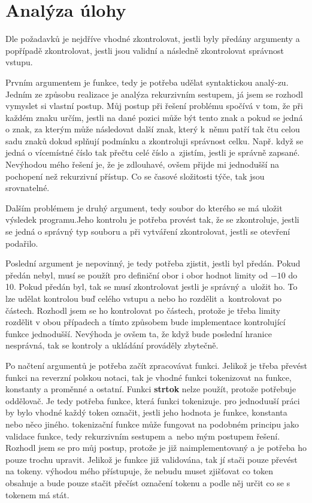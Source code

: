 \documentclass[../main.tex]{subfiles}
\begin{document}
\section{Analýza úlohy}
Dle požadavků je nejdříve vhodné zkontrolovat, jestli byly předány argumenty a popřípadě zkontrolovat, jestli jsou validní a následně zkontrolovat správnost vstupu.
\vspace{0.5em}

Prvním argumentem je funkce, tedy je potřeba udělat syntaktickou analý-zu. Jedním ze způsobu realizace je analýza rekurzivním sestupem, já jsem se rozhodl vymyslet si vlastní postup. Můj postup při řešení problému spočívá v tom, že při každém znaku určím, jestli na dané pozici může být tento znak a pokud se jedná o znak, za kterým může následovat další znak, který k~němu patří tak čtu celou sadu znaků dokud splňují podmínku a zkontroluji správnost celku. Např. když se jedná o vícemístné číslo tak přečtu celé číslo a~zjistím, jestli je správně zapsané. Nevýhodou mého řešení je, že je zdlouhavé, ovšem přijde mi jednodušší na pochopení než rekurzivní přístup. Co se časové složitosti týče, tak jsou srovnatelné.
\vspace{0.5em}

Dalším problémem je druhý argument, tedy soubor do kterého se má uložit výsledek programu.Jeho kontrolu je potřeba provést tak, že se zkontroluje, jestli se jedná o správný typ souboru a při vytváření zkontrolovat, jestli se otevření podařilo.
\vspace{0.5em}

Poslední argument je nepovinný, je tedy potřeba zjistit, jestli byl předán. Pokud předán nebyl, musí se použít pro definiční obor i obor hodnot limity od $-10$ do 10. Pokud předán byl, tak se musí zkontrolovat jestli je správný a~uložit ho. To lze udělat kontrolou buď celého vstupu a nebo ho rozdělit a~kontrolovat po částech. Rozhodl jsem se ho kontrolovat po částech, protože je třeba limity rozdělit v obou případech a tímto způsobem bude implementace kontrolující funkce jednodušší. Nevýhoda je ovšem ta, že když bude poslední hranice nesprávná, tak se kontroly a ukládání prováděly zbytečně.
\vspace{0.5em}

Po načtení argumentů je potřeba začít zpracovávat funkci. Jelikož je třeba převést funkci na reverzní polskou notaci, tak je vhodné funkci tokenizovat na funkce, konstanty a proměnné a ostatní. Funkci \textbf{strtok} nelze použít, protože potřebuje oddělovač. Je tedy potřeba funkce, která funkci tokenizuje. pro jednoduuší práci by bylo vhodné každý token označit, jestli jeho hodnota je funkce, konstanta nebo něco jiného. tokenizační funkce může fungovat na podobném principu jako validace funkce, tedy rekurzivním sestupem a~nebo mým postupem řešení. Rozhodl jsem se pro můj postup, protože je již naimplementovaný a je potřeba ho pouze trochu upravit. Jelikož je funkce již validována, tak jí stači pouze převést na tokeny. výhodou mého přístupuje, že nebudu muset zjišťovat co token obsahuje a bude pouze stačit přečíst označení tokenu a podle něj určit co se s tokenem má stát.
\vspace{0.5em}
\end{document}
